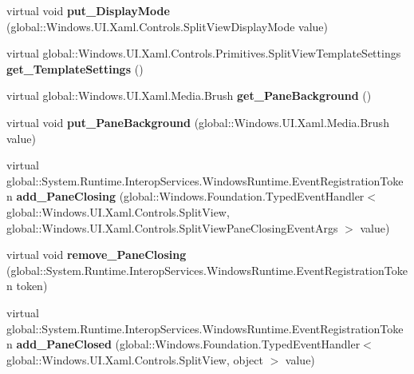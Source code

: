 \begin{DoxyCompactItemize}
virtual void {\bfseries put\+\_\+\+Display\+Mode} (global\+::\+Windows.\+U\+I.\+Xaml.\+Controls.\+Split\+View\+Display\+Mode value)
\item 
\mbox{\label{class_windows_1_1_u_i_1_1_xaml_1_1_controls_1_1_split_view_add67530a837afbb62bb137f7cc503647}} 
virtual global\+::\+Windows.\+U\+I.\+Xaml.\+Controls.\+Primitives.\+Split\+View\+Template\+Settings {\bfseries get\+\_\+\+Template\+Settings} ()
\item 
\mbox{\label{class_windows_1_1_u_i_1_1_xaml_1_1_controls_1_1_split_view_a47635cfeb856accea21323a3ca5eb9da}} 
virtual global\+::\+Windows.\+U\+I.\+Xaml.\+Media.\+Brush {\bfseries get\+\_\+\+Pane\+Background} ()
\item 
\mbox{\label{class_windows_1_1_u_i_1_1_xaml_1_1_controls_1_1_split_view_a6096724a8ab2470ff7286a1cb40cb0f3}} 
virtual void {\bfseries put\+\_\+\+Pane\+Background} (global\+::\+Windows.\+U\+I.\+Xaml.\+Media.\+Brush value)
\item 
\mbox{\label{class_windows_1_1_u_i_1_1_xaml_1_1_controls_1_1_split_view_a1f06fc0c80e7b9e8814204845dac854c}} 
virtual global\+::\+System.\+Runtime.\+Interop\+Services.\+Windows\+Runtime.\+Event\+Registration\+Token {\bfseries add\+\_\+\+Pane\+Closing} (global\+::\+Windows.\+Foundation.\+Typed\+Event\+Handler$<$ global\+::\+Windows.\+U\+I.\+Xaml.\+Controls.\+Split\+View, global\+::\+Windows.\+U\+I.\+Xaml.\+Controls.\+Split\+View\+Pane\+Closing\+Event\+Args $>$ value)
\item 
\mbox{\label{class_windows_1_1_u_i_1_1_xaml_1_1_controls_1_1_split_view_a7e6d1bbf867167e713891bded6a87a82}} 
virtual void {\bfseries remove\+\_\+\+Pane\+Closing} (global\+::\+System.\+Runtime.\+Interop\+Services.\+Windows\+Runtime.\+Event\+Registration\+Token token)
\item 
\mbox{\label{class_windows_1_1_u_i_1_1_xaml_1_1_controls_1_1_split_view_a97df60d3e67c146b713f4eb1565c5602}} 
virtual global\+::\+System.\+Runtime.\+Interop\+Services.\+Windows\+Runtime.\+Event\+Registration\+Token {\bfseries add\+\_\+\+Pane\+Closed} (global\+::\+Windows.\+Foundation.\+Typed\+Event\+Handler$<$ global\+::\+Windows.\+U\+I.\+Xaml.\+Controls.\+Split\+View, object $>$ value)

\end{DoxyCompactItemize}
